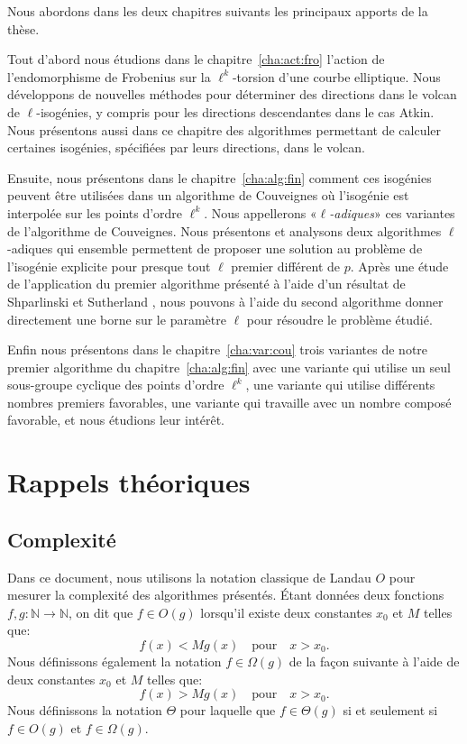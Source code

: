 \documentclass[10pt,a4paper]{book}
\theoremstyle{plain}
\theoremstyle{definition}
\theoremstyle{definition}
\theoremstyle{definition}
\theoremstyle{definition}
\theoremstyle{definition}
\theoremstyle{remark}
\theoremstyle{remark}
\theoremstyle{definition}
\begin{document}
Nous abordons dans les deux chapitres suivants les principaux apports de la thèse.

Tout d'abord nous étudions dans le chapitre~\ref{cha:act:fro} l'action de 
l'endomorphisme de Frobenius sur la $\ell^k$-torsion d'une courbe elliptique. 
Nous  développons de nouvelles méthodes pour déterminer des directions dans le 
volcan de $\ell$-isogénies, y compris pour les directions descendantes dans le 
cas Atkin. Nous présentons aussi dans ce chapitre des 
algorithmes permettant de calculer certaines isogénies, spécifiées par leurs 
directions, dans le volcan. 

Ensuite, nous présentons dans le chapitre~\ref{cha:alg:fin} comment ces 
isogénies peuvent être utilisées dans un algorithme de Couveignes
où l'isogénie est interpolée sur les points d'ordre $\ell^k$. Nous
appellerons «\emph{$\ell$-adiques}» ces variantes de l'algorithme de 
Couveignes. Nous présentons et analysons deux algorithmes $\ell$-adiques qui 
ensemble permettent de proposer une solution au problème de l'isogénie 
explicite pour presque tout $\ell$ premier différent de $p$. Après une étude
de l'application du premier algorithme présenté à l'aide d'un résultat de 
Shparlinski et Sutherland \cite{ShparlinskiSutherland14}, nous pouvons à l'aide
du second algorithme donner directement une borne sur le paramètre $\ell$ pour 
résoudre le problème étudié.

Enfin nous présentons dans le chapitre~\ref{cha:var:cou} trois variantes de notre
premier algorithme du chapitre~\ref{cha:alg:fin} 
avec une variante qui utilise un seul sous-groupe cyclique des points d'ordre $\ell^k$,
une variante qui utilise différents nombres premiers favorables,
une variante qui travaille avec un nombre composé favorable,
et nous étudions leur intérêt. 


\chapter{Rappels théoriques}
\label{cha:rappel}
\section{Complexit\'e}
Dans ce document, nous utilisons la notation classique de Landau $O$ pour mesurer la 
complexité des algorithmes présentés. Étant données deux fonctions $f,g: \mathbb{N} \rightarrow \mathbb{N}$, on dit que $f \in O(g)$ lorsqu'il existe deux constantes $x_0$ et $M$ telles que:
\[
f(x)<Mg(x) \quad \text{pour} \quad x>x_0.
\]
Nous définissons également la notation $f \in \Omega(g)$ de la façon suivante à l'aide de deux constantes $x_0$ et $M$ telles que: 
\[
f(x)>Mg(x) \quad \text{pour} \quad x>x_0.
\]
Nous définissons la notation $\Theta$ pour laquelle que $f \in \Theta(g)$ si et seulement si $f \in O(g)$ et $f \in \Omega(g)$.
\end{document}
